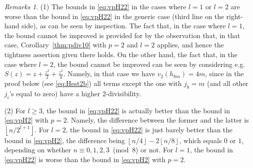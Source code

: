 \documentclass[12pt,reqno]{amsart}
\numberwithin{equation}{section}
\theoremstyle{remark}
\newtheorem*{remarks}{Remarks}
\begin{document}
\begin{remarks}
(1) The bounds in \eqref{eq:vpH22} in the cases where $l=1$ or $l=2$
are worse than the bound in \eqref{eq:vpH22} in the generic case
(third line on the right-hand side), as can be seen by inspection.
The fact that, in the case where $l=1$, the bound cannot be improved
is provided for by the observation that, in that case,
Corollary~\ref{thm:pdiv10} with $p=2$ and
$l=2$ applies, and hence the tightness assertion given there holds.
On the other hand, 
the fact that, in the case where $l=2$, the bound cannot be improved
can be seen by considering e.g.\ $S(z)=z+\frac {z^2} {2}+\frac {z^4} {4}$.
Namely, in that case we have $v_2(h_{8m})=4m$, since in
the proof below (see \eqref{eq:Hest2b}) all terms except the
one with $j_8=m$ (and all other $j_i$'s equal to zero) have
a higher $2$-divisibility.

\medskip
(2) For $l\ge3$, the bound in \eqref{eq:vpH22} is actually better
than the bound in \eqref{eq:vpH2} with $p=2$. Namely, the difference
between the former and the latter is
${\left\lfloor{{n} /{2^{l+1}}}\right\rfloor}$. For $l=2$, the bound in \eqref{eq:vpH22} is
just barely better than the bound in \eqref{eq:vpH2}, the difference
being ${\left\lfloor{n/4}\right\rfloor}-2{\left\lfloor{n/8}\right\rfloor}$, which equals $0$ or $1$, depending on
whether $n\equiv0,1,2,3$~(mod~$8$) or not. 
For $l=1$, the bound in \eqref{eq:vpH22} is worse
than the bound in \eqref{eq:vpH2} with $p=2$. 
\end{remarks}
\end{document}
